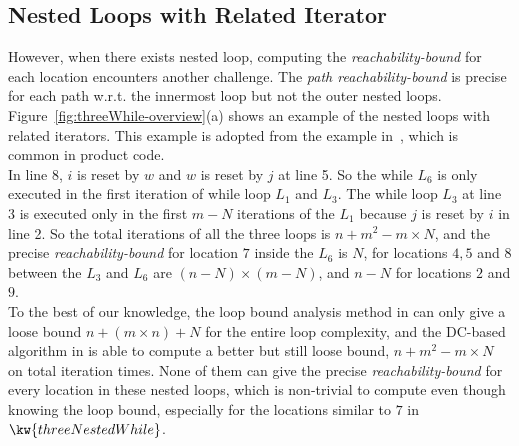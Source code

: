 \subsection{Nested Loops with Related Iterator}
\label{sec:overview-nestedwhile}
However, when there exists nested loop, computing the \emph{reachability-bound} for each location encounters another challenge.
The \emph{path reachability-bound} is precise for each path w.r.t. the innermost loop but not the outer nested loops.
Figure~\ref{fig:threeWhile-overview}(a) shows an example of the nested loops with related 
iterators.
This example is adopted from the example in~\cite{GulwaniJK09}, which is common in product code.
\\
In line 8, $i$ is reset by $w$ and $w$ is reset by $j$ at line 5. So the
while $L_6$ is only executed in the first iteration of while loop $L_1$ and $L_3$.
The while loop $L_3$ at line 3 is executed only in 
the first $m - N$ iterations of the 
$L_1$ because $j$ is reset by $i$ in line 2.
So the total iterations of all the three loops is
$n + m^2 - m \times N$,
and the precise \emph{reachability-bound} for location $7$ inside the $L_6$ is $N$,
for locations $4, 5$ and $8$ between the $L_3$ and $L_6$ are $(n-N) \times (m - N)$,
and $n - N$ for locations $2$ and $9$.
\\
To the best of our knowledge, the loop bound analysis method in \cite{GulwaniJK09} can only give a loose bound $n + (m \times n) + N$ for the entire loop complexity, and 
the DC-based algorithm in \cite{SinnZV17} is able to
compute a better but still loose bound, $n + m^2 - m \times N$ on total iteration times.
None of them can give the precise \emph{reachability-bound} for every location in these nested loops,
which is non-trivial to compute even though knowing the loop bound,
especially for the locations similar to $7$ in $\kw{threeNestedWhile}$.
\\
